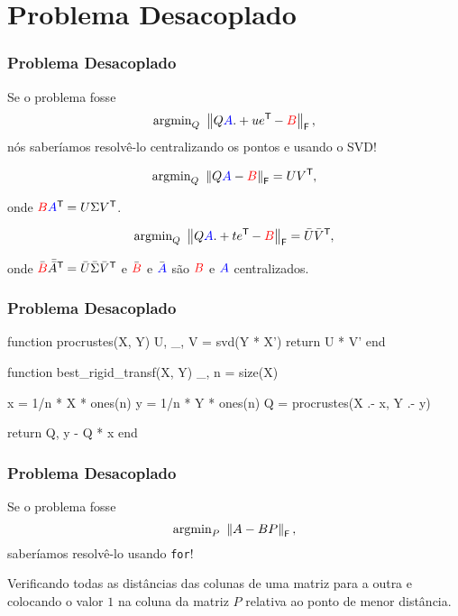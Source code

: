 
\section{Problema Desacoplado}

\begin{frame}[fragile]
  \frametitle{Problema Desacoplado}

  \begin{center}
    Se o problema fosse \[\text{argmin}_{Q}\,\, \left\lVert Q\textcolor{blue}{A} .+ u e^{\mathsf{T}\mkern-1mu} - \textcolor{red}{B}\right\rVert_\mathsf{F},\] nós saberíamos resolvê-lo centralizando os pontos e usando o SVD!


  \[\text{argmin}_{Q}\,\, \left\lVert Q\textcolor{blue}{A} - \textcolor{red}{B}\right\rVert_\mathsf{F} = U V^{\mathsf{T}\mkern-1mu},\]

  onde $\textcolor{red}{B} \textcolor{blue}{A}^{\mathsf{T}\mkern-1mu} = U \Sigma V^{\mathsf{T}\mkern-1mu}$.


  \[\text{argmin}_{Q}\,\, \left\lVert Q\textcolor{blue}{A} .+ t e^{\mathsf{T}\mkern-1mu} - \textcolor{red}{B}\right\rVert_\mathsf{F} = \bar{U} \bar{V}^{\mathsf{T}\mkern-1mu},\]

  onde $\bar{\textcolor{red}{B}} \bar{\bar{A}}^{\mathsf{T}\mkern-1mu} = \bar{U} \bar{\Sigma} \bar{V}^{\mathsf{T}\mkern-1mu}$ e $\bar{\textcolor{red}{B}}$ e $\bar{\textcolor{blue}{A}}$ são $\textcolor{red}{B}$ e $\textcolor{blue}{A}$ centralizados.
  \end{center}
\end{frame}

\begin{frame}[fragile]
  \frametitle{Problema Desacoplado}
  \begin{code}
    function procrustes(X, Y)
      U, _, V = svd(Y * X')
      return U * V'
    end
  \end{code}
  \begin{code}
    function best_rigid_transf(X, Y)
      _, n = size(X)

      x = 1/n * X * ones(n)
      y = 1/n * Y * ones(n)
      Q = procrustes(X .- x, Y .- y)

      return Q, y - Q * x
    end
  \end{code}
\end{frame}

\begin{frame}[fragile]
  \frametitle{Problema Desacoplado}

  \begin{center}
    Se o problema fosse \[\text{argmin}_{P}\,\, \left\lVert A - BP\right\rVert_\mathsf{F},\] saberíamos resolvê-lo usando \texttt{for}!

    \vspace{1cm}
    Verificando todas as distâncias das colunas de uma matriz para a outra e colocando o valor $1$ na coluna da matriz $P$ relativa ao ponto de menor distância.
  \end{center}
\end{frame}

